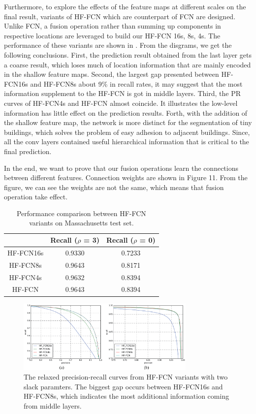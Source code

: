 Furthermore, to explore the effects of the feature maps at different scales on the final result, variants of HF-FCN which are counterpart of FCN are designed. 
Unlike FCN, a fusion operation rather than summing up components in respective locations are leveraged to build our HF-FCN 16s, 8s, 4s. 
The performance of these variants are shown in . 
From the disgrams, we get the following conclusions. First, the prediction result obtained from the last layer gets a coarse result, which loses much of location information that are mainly encoded in the shallow feature maps. Second, the largest gap presented between HF-FCN16s and HF-FCN8s about 9{\%} in recall rates, it may suggest that the most information supplement to the HF-FCN is got in middle layers. Third, the PR curves of HF-FCN4s and HF-FCN almost coincide. It illustrates the low-level information has little effect on the prediction results. Forth, with the addition of the shallow feature map, the network is more distinct for the segmentation of tiny buildings, which solves the problem of easy adhesion to adjacent buildings. Since, all the conv layers contained useful hierarchical information that is critical to the final prediction.


In the end, we want to prove that our fusion operations learn the connections between different features. Connection weights are shown in Figure 11. From the figure, we can see the weights are not the same, which means that fusion operation take effect.
\begin{table}
\centering
\caption {Performance comparison between HF-FCN variants on Massachusetts test set.}
\begin{tabular}{ccc}
\hline
&Recall ($\rho$ = 3)&Recall ($\rho$ = 0)\\
\hline
HF-FCN16s&0.9330&0.7233\\
HF-FCN8s&0.9643&0.8171\\
HF-FCN4s&0.9632&0.8394\\
HF-FCN&0.9643&0.8394\\
\hline
\end{tabular}
\end{table}

\begin{figure}
\centering
\includegraphics[width=8.7cm]{Figures/HF-FCN-variant-PR.eps}
\caption{The relaxed precision-recall curves from HF-FCN variants with two slack paramters. The biggest gap occurs between HF-FCN16s and HF-FCN8s, which indicates the most additional information coming from middle layers.}
\label{8}
\end{figure}

